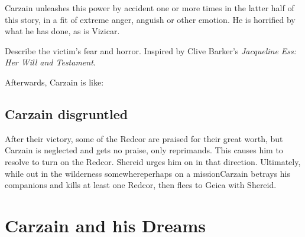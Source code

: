 \begin{garbage}
Carzain unleashes this power by accident one or more times in the latter half of this story, in a fit of extreme anger, anguish or other emotion. He is horrified by what he has done, as is Vizicar. 

Describe the victim's fear and horror. Inspired by Clive Barker's \emph{Jacqueline Ess: Her Will and Testament}. 

Afterwards, Carzain is like: 







\subsection{Carzain disgruntled}
After their victory, some of the Redcor are praised for their great worth, but Carzain is neglected and gets no praise, only reprimands. This causes him to resolve to turn on the Redcor. Shereid urges him on in that direction. Ultimately, while out in the wilderness somewhere\dash perhaps on a mission\dash Carzain betrays his \Redcean{} companions and kills at least one Redcor, then flees to Geica with Shereid. 


















\section{Carzain and his Dreams}










\end{garbage}
